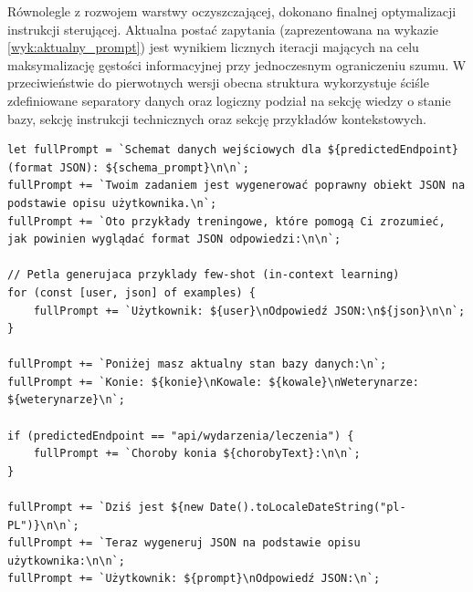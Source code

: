 Równolegle z rozwojem warstwy oczyszczającej, dokonano finalnej optymalizacji instrukcji sterującej. Aktualna postać zapytania (zaprezentowana na wykazie \ref{wyk:aktualny_prompt}) jest wynikiem licznych iteracji mających na celu maksymalizację gęstości informacyjnej przy jednoczesnym ograniczeniu szumu. W przeciwieństwie do pierwotnych wersji obecna struktura wykorzystuje ściśle zdefiniowane separatory danych oraz logiczny podział na sekcję wiedzy o stanie bazy, sekcję instrukcji technicznych oraz sekcję przykładów kontekstowych.


\begin{wykaz}[ht]
    \centering
    \begin{tcolorbox}[
        colback=lightbg, 
        colframe=grayframe, 
        arc=1mm, 
        boxrule=0.5pt,
        left=2mm, right=2mm, top=2mm, bottom=2mm
    ]
\begin{lstlisting}
let fullPrompt = `Schemat danych wejściowych dla ${predictedEndpoint} (format JSON): ${schema_prompt}\n\n`;
fullPrompt += `Twoim zadaniem jest wygenerować poprawny obiekt JSON na podstawie opisu użytkownika.\n`;
fullPrompt += `Oto przykłady treningowe, które pomogą Ci zrozumieć, jak powinien wyglądać format JSON odpowiedzi:\n\n`;

// Petla generujaca przyklady few-shot (in-context learning)
for (const [user, json] of examples) {
    fullPrompt += `Użytkownik: ${user}\nOdpowiedź JSON:\n${json}\n\n`;
}

fullPrompt += `Poniżej masz aktualny stan bazy danych:\n`;
fullPrompt += `Konie: ${konie}\nKowale: ${kowale}\nWeterynarze: ${weterynarze}\n`;

if (predictedEndpoint == "api/wydarzenia/leczenia") {
    fullPrompt += `Choroby konia ${chorobyText}:\n\n`;
}

fullPrompt += `Dziś jest ${new Date().toLocaleDateString("pl-PL")}\n\n`;
fullPrompt += `Teraz wygeneruj JSON na podstawie opisu użytkownika:\n\n`;
fullPrompt += `Użytkownik: ${prompt}\nOdpowiedź JSON:\n`;
\end{lstlisting}
    \end{tcolorbox}
    \caption{Zoptymalizowana struktura promptu zintegrowana z kontekstem bazy danych i dynamicznym schematem.}
    \label{wyk:aktualny_prompt}
\end{wykaz}

